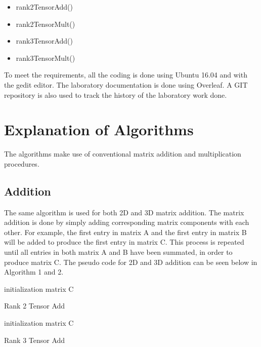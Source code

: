 \documentclass[twocolumn, 11pt]{IEEEtran}
\begin{document}
\begin{itemize}

\item rank2TensorAdd()
\item rank2TensorMult()
\item rank3TensorAdd()
\item rank3TensorMult()

\end{itemize}


To meet the requirements, all the coding is done using Ubuntu 16.04 and with the gedit editor. The laboratory documentation is done using Overleaf. A GIT repository is also used to track the history of the laboratory work done. 



\section{Explanation of Algorithms}

The algorithms make use of conventional matrix addition and multiplication procedures.


\subsection{Addition}

 The same algorithm is used for both 2D and 3D matrix addition. The matrix addition is done by simply adding corresponding matrix components with each other. For example, the first entry in matrix A and the first entry in matrix B will be added to produce the first entry in matrix C. This process is repeated until all entries in both matrix A and B have been summated, in order to produce matrix C. The pseudo code for 2D and 3D addition can be seen below in Algorithm 1 and 2.

\begin{algorithm}
\SetAlgoLined
     initialization matrix C\;
     \caption{Rank 2 Tensor Add}
\end{algorithm}

\begin{algorithm}
\SetAlgoLined
     initialization matrix C\;
     \caption{Rank 3 Tensor Add}
\end{algorithm}
\end{document}
